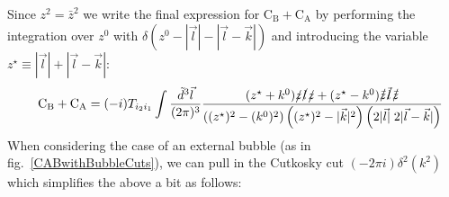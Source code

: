 \documentclass[11pt]{article}
\begin{document}
Since $z^2=\bar{z}^2$ 
we write the final expression for $\textrm{C}_\textrm{B}+ \textrm{C}_\textrm{A}$ by performing the integration over $z^0$ with $\delta \left(z^0-|\vec{l}|-|\vec{l}-\vec{k}|\right)$ and introducing the variable $z^\star \equiv |\vec{l}|+|\vec{l}-\vec{k}|$:
\begin{eqnarray}
\label{OurFinalOffshellExpressionSelfEnergy}
&& \textrm{C}_\textrm{B}+ \textrm{C}_\textrm{A} = (-i)T_{i_2 i_1} \int \frac{\tilde{d}^3 \vec{l}}{(2\pi)^3}
\frac{
(z^\star+k^0) \slashed{z}\slashed{l}\slashed{z} + (z^\star-k^0)  \slashed{\bar{z}}\slashed{\bar{l}}\slashed{\bar{z}}
}{
\left( (z^\star)^2-(k^0)^2 \right) \left( (z^\star)^2-|\vec{k}|^2\right) \left( 2 |\vec{l}|\; 2 |\vec{l}-\vec{k}| \right) } \nonumber\\
\end{eqnarray}
When considering the case of an external bubble (as in fig.~\ref{CABwithBubbleCuts}), we can pull in the Cutkosky cut $(-2\pi i)\delta^2\left(k^2\right)$ which simplifies the above a bit as follows:
\end{document}
